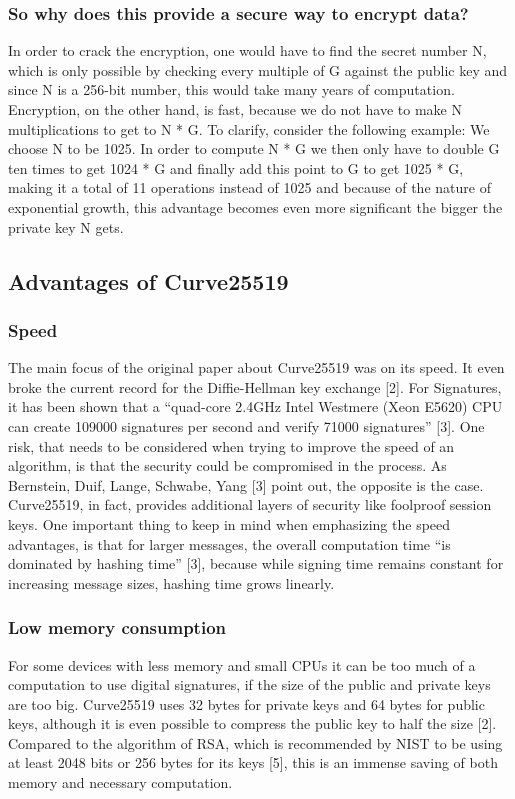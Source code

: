 \subsubsection{So why does this provide a secure way to encrypt data?}
In order to crack the encryption, one would have to find the secret number N, which is only possible by checking every multiple of G against the public key and since N is a 256-bit number, this would take many years of computation.
Encryption, on the other hand, is fast, because we do not have to make N multiplications to get to N * G. To clarify, consider the following example:
We choose N to be 1025. In order to compute N * G we then only have to double G ten times to get 1024 * G and finally add this point to G to get 1025 * G, making it a total of 11 operations instead of 1025 and because of the nature of exponential growth, this advantage becomes even more significant the bigger the private key N gets.

\subsection{Advantages of Curve25519}
\subsubsection{Speed}
The main focus of the original paper about Curve25519 was on its speed. It even broke the current record for the Diffie-Hellman key exchange [2]. For Signatures, it has been shown that a ``quad-core 2.4GHz Intel Westmere (Xeon E5620) CPU can create 109000 signatures per second and verify 71000 signatures'' [3]. One risk, that needs to be considered when trying to improve the speed of an algorithm, is that the security could be compromised in the process. As Bernstein, Duif, Lange, Schwabe, Yang [3] point out, the opposite is the case. Curve25519, in fact, provides additional layers of security like foolproof session keys. One important thing to keep in mind when emphasizing the speed advantages, is that for larger messages, the overall computation time “is dominated by hashing time” [3], because while signing time remains constant for increasing message sizes, hashing time grows linearly. 

\subsubsection{Low memory consumption}
For some devices with less memory and small CPUs it can be too much of a computation to use digital signatures, if the size of the public and private keys are too big. Curve25519 uses 32 bytes for private keys and 64 bytes for public keys, although it is even possible to compress the public key to half the size [2]. Compared to the algorithm of RSA, which is recommended by NIST to be using at least 2048 bits or 256 bytes for its keys [5], this is an immense saving of both memory and necessary computation.

